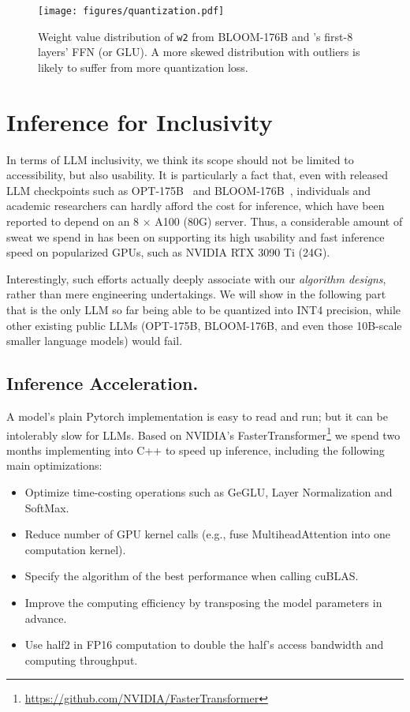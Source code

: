 {\begin{figure}[t]
    \centering
    \texttt{[image: figures/quantization.pdf]}
    \caption{Weight value distribution of \texttt{w2} from BLOOM-176B and \glm's first-8 layers' FFN (or GLU). A more skewed distribution with outliers is likely to suffer from more quantization loss.}
    \label{fig:weight_dist}
    \vspace{-5mm}
\end{figure}

\section{Inference for Inclusivity}
In terms of LLM inclusivity, we think its scope should not be limited to accessibility, but also usability.
It is particularly a fact that, even with released LLM checkpoints such as OPT-175B~\citep{zhang2022opt} and BLOOM-176B~\citep{scao2022what}, individuals and academic researchers can hardly afford the cost for inference, which have been reported to depend on an 8 $\times$ A100 (80G) server.
Thus, a considerable amount of sweat we spend in \glm has been on supporting its high usability and fast inference speed on popularized GPUs, such as NVIDIA RTX 3090 Ti (24G).

Interestingly, such efforts actually deeply associate with our \textit{algorithm designs}, rather than mere engineering undertakings.
We will show in the following part that \glm is the only LLM so far being able to be quantized into INT4 precision, while other existing public LLMs (OPT-175B, BLOOM-176B, and even those 10B-scale smaller language models) would fail.

\subsection{Inference Acceleration.}
A model's plain Pytorch implementation is easy to read and run; but it can be intolerably slow for LLMs. 
Based on NVIDIA's FasterTransformer\footnote{\url{https://github.com/NVIDIA/FasterTransformer}} we spend two months implementing \glm into C++ to speed up inference, including the following main optimizations: 
\begin{itemize}[leftmargin=*,itemsep=0pt,parsep=0.2em,topsep=0.0em,partopsep=0.0em]
    \item Optimize time-costing operations such as GeGLU, Layer Normalization and SoftMax.
    \item Reduce number of GPU kernel calls (e.g., fuse MultiheadAttention into one computation kernel).
    \item Specify the algorithm of the best performance when calling cuBLAS.
    \item Improve the computing efficiency by transposing the model parameters in advance.
    \item Use half2 in FP16 computation to double the half's access bandwidth and computing throughput.
\end{itemize}

}
